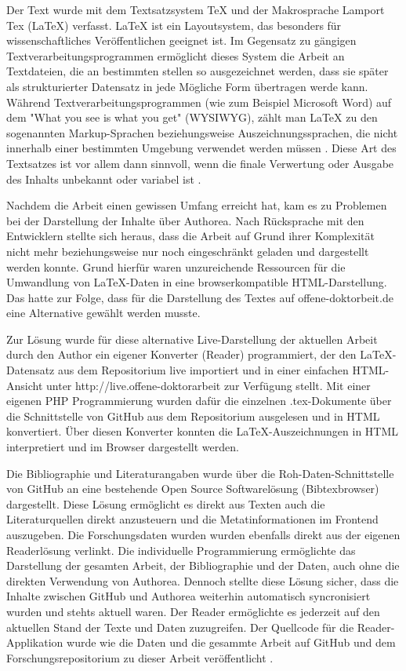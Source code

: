 Der Text wurde mit dem Textsatzsystem TeX und der Makrosprache Lamport Tex (LaTeX) verfasst. LaTeX ist ein Layoutsystem, das besonders für wissenschaftliches Veröffentlichen geeignet ist. Im Gegensatz zu gängigen Textverarbeitungsprogrammen ermöglicht dieses System die Arbeit an Textdateien, die an bestimmten stellen so ausgezeichnet werden, dass sie später als strukturierter Datensatz in jede Mögliche Form übertragen werde kann. Während Textverarbeitungsprogrammen (wie zum Beispiel Microsoft Word) auf dem "What you see is what you get" (WYSIWYG), zählt man LaTeX zu den sogenannten Markup-­Sprachen beziehungsweise Auszeichnungssprachen, die nicht innerhalb einer bestimmten Umgebung verwendet werden müssen \cite{Sievers_2012}. Diese Art des Textsatzes ist vor allem dann sinnvoll, wenn die finale Verwertung oder Ausgabe des Inhalts unbekannt oder variabel ist  \cite{braune_2007_latex}.

Nachdem die Arbeit einen gewissen Umfang erreicht hat, kam es zu Problemen bei der Darstellung der Inhalte über Authorea. Nach Rücksprache mit den Entwicklern stellte sich heraus, dass die Arbeit auf Grund ihrer Komplexität nicht mehr beziehungsweise nur noch eingeschränkt geladen und dargestellt werden konnte. Grund hierfür waren unzureichende Ressourcen für die Umwandlung von LaTeX-Daten in eine browserkompatible HTML-Darstellung. Das hatte zur Folge, dass für die Darstellung des Textes auf offene-doktorbeit.de eine Alternative gewählt werden musste.

Zur Lösung wurde für diese alternative Live-Darstellung der aktuellen Arbeit durch den Author ein eigener Konverter (Reader) programmiert, der den LaTeX-Datensatz aus dem Repositorium live importiert und in einer einfachen HTML-Ansicht unter http://live.offene-doktorarbeit zur Verfügung stellt. Mit einer eigenen PHP Programmierung wurden dafür die einzelnen .tex-Dokumente über die Schnittstelle von GitHub aus dem Repositorium ausgelesen und in HTML konvertiert. Über diesen Konverter konnten die LaTeX-Auszeichnungen in HTML interpretiert und im Browser dargestellt werden.

Die Bibliographie und Literaturangaben wurde über die Roh-Daten-Schnittstelle von GitHub an eine bestehende Open Source Softwarelösung (Bibtexbrowser) dargestellt. Diese Lösung ermöglicht es direkt aus Texten auch die Literaturquellen direkt anzusteuern und die Metatinformationen im Frontend auszugeben. Die Forschungsdaten wurden wurden ebenfalls direkt aus der eigenen Readerlösung verlinkt. Die individuelle Programmierung ermöglichte das Darstellung der gesamten Arbeit, der Bibliographie und der Daten, auch ohne die direkten Verwendung von Authorea. Dennoch stellte diese Lösung sicher, dass die Inhalte zwischen GitHub und Authorea weiterhin automatisch syncronisiert wurden und stehts aktuell waren. Der Reader ermöglichte es jederzeit auf den aktuellen Stand der Texte und Daten zuzugreifen. Der Quellcode für die Reader-Applikation wurde wie die Daten und die gesammte Arbeit auf GitHub und dem Forschungsrepositorium zu dieser Arbeit veröffentlicht \cite{heise_2015_reader}.

